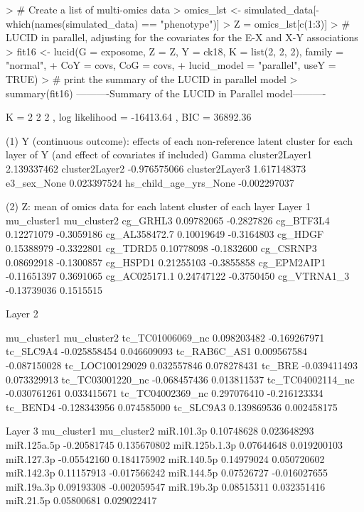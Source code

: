 \begin{example}
> # Create a list of multi-omics data
> omics_lst <- simulated_data[-which(names(simulated_data) == "phenotype")]
> Z = omics_lst[c(1:3)]
> # LUCID in parallel, adjusting for the covariates for the E-X and X-Y associations
> fit16 <- lucid(G = exposome, Z = Z, Y = ck18, K = list(2, 2, 2), family = "normal",
+                CoY = covs, CoG = covs,
+                lucid_model = "parallel", useY = TRUE)
> # print the summary of the LUCID in parallel model
> summary(fit16)
----------Summary of the LUCID in Parallel model----------

K =  2 2 2 , log likelihood = -16413.64 , BIC =  36892.36

(1) Y (continuous outcome): effects of each non-reference latent cluster
    for each layer of Y
(and effect of covariates if included)
                             Gamma
cluster2Layer1         2.139337462
cluster2Layer2        -0.976575066
cluster2Layer3         1.617148373
e3_sex_None            0.023397524
hs_child_age_yrs_None -0.002297037

(2) Z: mean of omics data for each latent cluster of each layer
Layer  1
              mu_cluster1 mu_cluster2
cg_GRHL3       0.09782065  -0.2827826
cg_BTF3L4      0.12271079  -0.3059186
cg_AL358472.7  0.10019649  -0.3164803
cg_HDGF        0.15388979  -0.3322801
cg_TDRD5       0.10778098  -0.1832600
cg_CSRNP3      0.08692918  -0.1300857
cg_HSPD1       0.21255103  -0.3855858
cg_EPM2AIP1   -0.11651397   0.3691065
cg_AC025171.1  0.24747122  -0.3750450
cg_VTRNA1_3   -0.13739036   0.1515515


Layer  2

                  mu_cluster1  mu_cluster2
tc_TC01006069_nc  0.098203482 -0.169267971
tc_SLC9A4        -0.025858454  0.046609093
tc_RAB6C_AS1      0.009567584 -0.087150028
tc_LOC100129029   0.032557846  0.078278431
tc_BRE           -0.039411493  0.073329913
tc_TC03001220_nc -0.068457436  0.013811537
tc_TC04002114_nc -0.030761261  0.033415671
tc_TC04002369_nc  0.297076410 -0.216123334
tc_BEND4         -0.128343956  0.074585000
tc_SLC9A3         0.139869536  0.002458175

Layer  3
              mu_cluster1  mu_cluster2
miR.101.3p     0.10748628  0.023648293
miR.125a.5p   -0.20581745  0.135670802
miR.125b.1.3p  0.07644648  0.019200103
miR.127.3p    -0.05542160  0.184175902
miR.140.5p     0.14979024  0.050720602
miR.142.3p     0.11157913 -0.017566242
miR.144.5p     0.07526727 -0.016027655
miR.19a.3p     0.09193308 -0.002059547
miR.19b.3p     0.08515311  0.032351416
miR.21.5p      0.05800681  0.029022417


\end{example}
